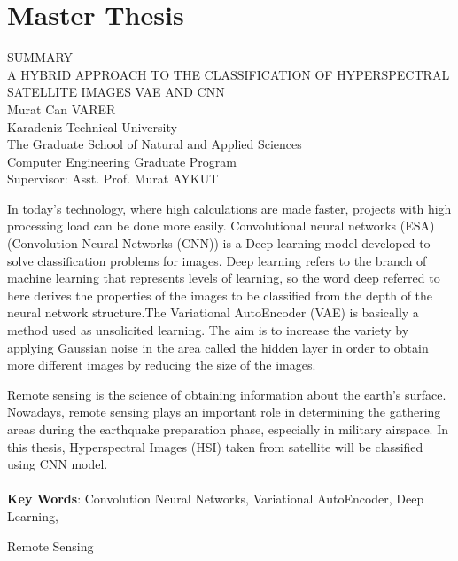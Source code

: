 \chapter*{ \normalfont Master Thesis}

\begin{center}
    \vspace{-1.25cm}
    SUMMARY\\
    \vspace{0.33cm}
    A HYBRID APPROACH TO THE CLASSIFICATION OF HYPERSPECTRAL SATELLITE IMAGES VAE AND CNN \\
    \vspace{0.33cm}
    Murat Can VARER\\
    \vspace{0.33cm}
    Karadeniz Technical University\\
    The Graduate School of Natural and Applied Sciences\\
    Computer Engineering Graduate Program\\ 
    Supervisor: Asst. Prof. Murat AYKUT
\end{center}
\vspace{0.5cm}
In today's technology, where high calculations are made faster, projects with high processing load can be done more easily. Convolutional neural networks (ESA) (Convolution Neural Networks (CNN)) is a Deep learning model developed to solve classification problems for images.
Deep learning refers to the branch of machine learning that represents levels of learning, so the word deep referred to here derives the properties of the images to be classified from the depth of the neural network structure.The Variational AutoEncoder (VAE) is basically a method used as unsolicited learning. The aim is to increase the variety by applying Gaussian noise in the area called the hidden layer in order to obtain more different images by reducing the size of the images.

Remote sensing is the science of obtaining information about the earth's surface. Nowadays, remote sensing plays an important role in determining the gathering areas during the earthquake preparation phase, especially in military airspace. In this thesis, Hyperspectral Images (HSI) taken from satellite will be classified using CNN model.
\\
\\
\textbf{Key Words}: Convolution Neural Networks, Variational AutoEncoder, Deep Learning,


                    \hspace{1.12cm} Remote Sensing

